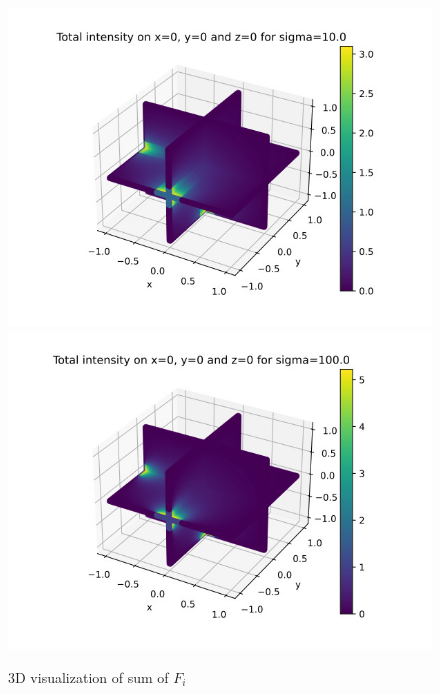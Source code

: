 \documentclass[11pt,titlepage]{article}
\begin{document}
\begin{figure}[H]
    \centering
    \caption{3D visualization of sum of $F_i$}
    \includegraphics[width=1.0\textwidth]{img/3d_sym_gauss_seidel_10.0.jpg}
    \label{fig:3d_10}
    \includegraphics[width=1.0\textwidth]{img/3d_sym_gauss_seidel_100.0.jpg}
    \label{fig:3d_100}
\end{figure}
\end{document}
